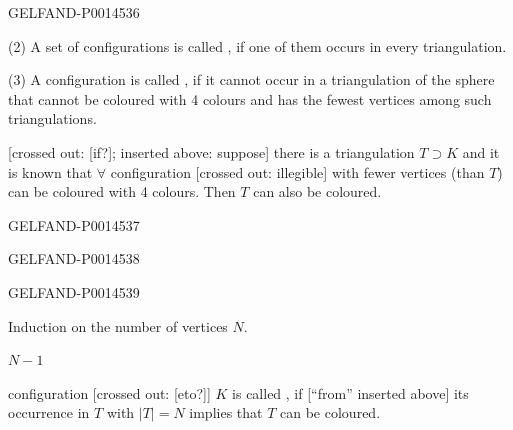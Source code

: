 \begin{GelfandAdjacentEvidence}{GELFAND-P001453}{6}


(2) A set of configurations is called , if one of them occurs in every triangulation.

(3) A configuration is called , if it cannot occur in a triangulation of the sphere that cannot be coloured with 4 colours and has the fewest vertices among such triangulations.

[crossed out: [if?]; inserted above: suppose] there is a triangulation \(T\supset K\) and it is known that
\(\forall\) configuration [crossed out: illegible]
with fewer vertices (than \(T\)) can be coloured with 4 colours. Then \(T\) can also be coloured.
\end{GelfandAdjacentEvidence}
\begin{GelfandAdjacentEvidence}{GELFAND-P001453}{7}

\end{GelfandAdjacentEvidence}
\begin{GelfandAdjacentEvidence}{GELFAND-P001453}{8}

\end{GelfandAdjacentEvidence}
\begin{GelfandAdjacentEvidence}{GELFAND-P001453}{9}


Induction on the number of vertices \(N\).

 \(N-1\) 

configuration [crossed out: [eto?]] \(K\) is called , if [“from” inserted above] its occurrence in \(T\)
with \(|T|=N\) implies that \(T\) can be coloured.
\end{GelfandAdjacentEvidence}

